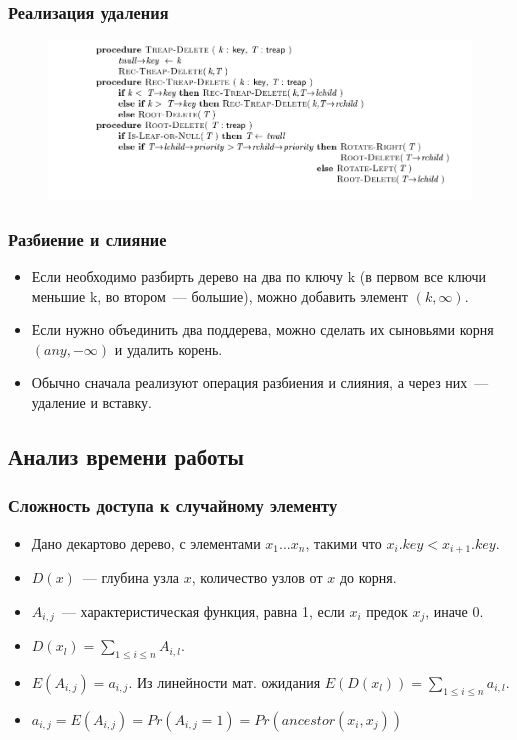 \documentclass[hyperref={unicode=true}]{beamer}
\begin{document}
\frame
{
  \frametitle{Реализация удаления}
   \begin{figure}[h!]
  \centerline{\includegraphics[scale=0.4]{del-algo.png}}
  \end{figure}
} 

\frame
{
  \frametitle{Разбиение и слияние}
  \begin{itemize}
    \item Если необходимо разбирть дерево на два по ключу k (в первом все ключи меньшие k, во втором~--- большие), можно добавить элемент $(k, \infty)$.
    \item Если нужно объединить два поддерева, можно сделать их сыновьями корня $(any, -\infty)$ и удалить корень.
    \item Обычно сначала реализуют операция разбиения и слияния, а через них~--- удаление и вставку.
  \end{itemize}
}

\subsection{Анализ времени работы}
\frame
{
\frametitle{Сложность доступа к случайному элементу}
 \begin{itemize}
   \item Дано декартово дерево, с элементами $x_1...x_n$, такими что $x_i.key < x_{i+1}.key$.
   \item $D(x)$~--- глубина узла $x$, количество узлов от $x$ до корня.
   \item $A_{i,j}$~--- характеристическая функция, равна 1, если $x_i$ предок $x_j$, иначе 0.
   \item $D(x_l) = \sum_{1 \leq i \leq n} A_{i, l}$.
   \item $E(A_{i,j}) = a_{i, j}$. Из линейности мат. ожидания $E(D(x_l)) = \sum_{1 \leq i \leq n} a_{i, l}$.
   \item $a_{i,j} = E(A_{i,j}) = Pr(A_{i,j} = 1) = Pr(ancestor(x_i, x_j))$
 \end{itemize}
}
\end{document}
